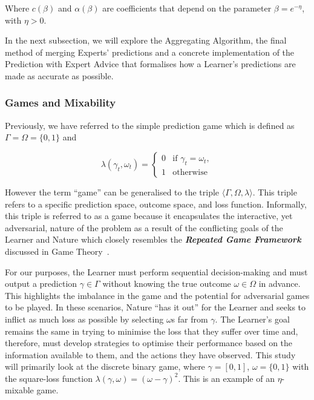 Where $c(\beta)$ and $\alpha(\beta)$ are coefficients that depend on the parameter $\beta = e^{-\eta}$, with $\eta > 0$.

In the next subsection, we will explore the Aggregating Algorithm, the final method of merging Experts' predictions and a concrete implementation of the Prediction with Expert Advice that formalises how a Learner's predictions are made as accurate as possible.

\subsubsection{Games and Mixability}\label{subsubsection:games_and_mixability}
Previously, we have referred to the simple prediction game which is defined as $\Gamma = \Omega = \{0, 1\}$ and

\begin{equation*}
    \lambda(\gamma_t, \omega_t) = \begin{cases}
        0 & \text{if } \gamma_t = \omega_t,
        \\ 1 & \text{otherwise}
    \end{cases}
\end{equation*}

However the term ``game'' can be generalised to the triple $\langle \Gamma, \Omega, \lambda \rangle$. This triple refers to a specific prediction space, outcome space, and loss function. Informally, this triple is referred to as a game because it encapsulates the interactive, yet adversarial, nature of the problem as a result of the conflicting goals of the Learner and Nature which closely resembles the \textbf{\textit{Repeated Game Framework}} discussed in Game Theory~\cite{mertens:1990}.

For our purposes, the Learner must perform sequential decision-making and must output a prediction $\gamma \in \Gamma$ without knowing the true outcome $\omega \in \Omega$ in advance. This highlights the imbalance in the game and the potential for adversarial games to be played. In these scenarios, Nature ``has it out'' for the Learner and seeks to inflict as much loss as possible by selecting $\omega$s far from $\gamma$.  The Learner's goal remains the same in trying to minimise the loss that they suffer over time and, therefore, must develop strategies to optimise their performance based on the information available to them, and the actions they have observed.
This study will primarily look at the discrete binary game, where $\gamma = [0, 1]$, $\omega = \{0, 1\}$ with the square-loss function $\lambda(\gamma, \omega) = {(\omega - \gamma)}^2$. This is an example of an $\eta$-mixable game.

